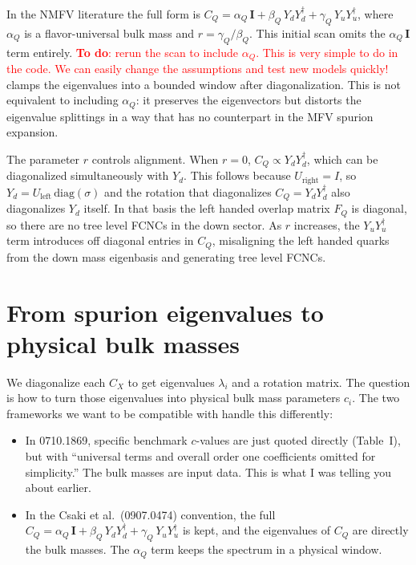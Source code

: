 \documentclass[11pt]{article}
\begin{document}
In the NMFV literature the full form is $C_Q = \alpha_Q\,\mathbf{I} +
\beta_Q\,Y_d Y_d^\dagger + \gamma_Q\,Y_u Y_u^\dagger$, where $\alpha_Q$ is
a flavor-universal bulk mass and $r = \gamma_Q / \beta_Q$. This initial scan omits the
$\alpha_Q\,\mathbf{I}$ term entirely. 
\textcolor{red}{\textbf{To do}: rerun the scan to include $\alpha_Q$. This is very simple to do in the code. We can easily change the assumptions and test new models quickly!} clamps the eigenvalues into a bounded window after
diagonalization. This is not equivalent to including $\alpha_Q$: it preserves
the eigenvectors but distorts the eigenvalue splittings in a way that has no
counterpart in the MFV spurion expansion.

The parameter $r$ controls alignment. When $r = 0$, $C_Q \propto Y_d Y_d^\dagger$,
which can be diagonalized simultaneously with $Y_d$. This follows because $U_{\mathrm{right}} = I$,
so $Y_d = U_{\mathrm{left}}\,\mathrm{diag}(\sigma)$ and the
rotation that diagonalizes $C_Q = Y_d Y_d^\dagger$ also diagonalizes
$Y_d$ itself. In that basis the
left handed overlap matrix $F_Q$ is diagonal, so there are no tree level FCNCs
in the down sector. As $r$ increases, the $Y_u Y_u^\dagger$ term introduces off diagonal entries
in $C_Q$, misaligning the left handed quarks from the down mass eigenbasis and
generating tree level FCNCs.


\section{From spurion eigenvalues to physical bulk masses}

We diagonalize each $C_X$ to get eigenvalues $\lambda_i$ and a rotation
matrix. The question is how to turn those eigenvalues into physical bulk mass
parameters $c_i$. The two frameworks we want to be compatible with handle
this differently:
\begin{itemize}
  \item In 0710.1869, specific benchmark $c$-values are just quoted directly
    (Table~I), but with ``universal terms and overall order one coefficients
    omitted for simplicity.'' The bulk masses are input data. This is what I was telling you about earlier.
  \item In the Csaki et al.\ (0907.0474) convention, the full
    $C_Q = \alpha_Q\,\mathbf{I} + \beta_Q\,Y_d Y_d^\dagger +
    \gamma_Q\,Y_u Y_u^\dagger$ is kept, and the eigenvalues of $C_Q$ are
    directly the bulk masses. The $\alpha_Q$ term keeps the spectrum in a
    physical window.
\end{itemize}
\end{document}
